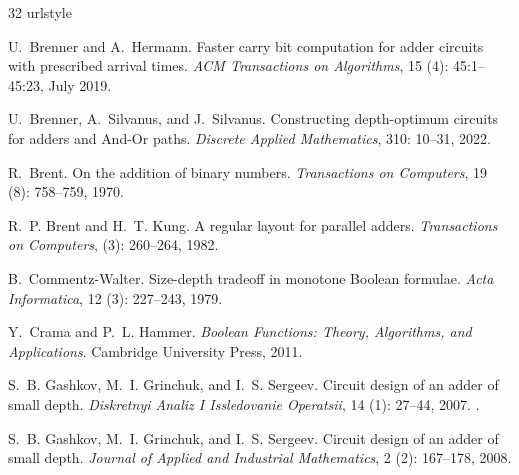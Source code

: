 \begin{thebibliography}{32}
\providecommand{\natexlab}[1]{#1}
\providecommand{\url}[1]{\texttt{#1}}
\expandafter\ifx\csname urlstyle\endcsname\relax
  \providecommand{\doi}[1]{doi: #1}\else
  \providecommand{\doi}{doi: \begingroup \urlstyle{rm}\Url}\fi

U.~Brenner and A.~Hermann.
\newblock Faster carry bit computation for adder circuits with prescribed
  arrival times.
\newblock \emph{ACM Transactions on Algorithms}, 15 (4):
  45:1--45:23, July 2019.

U.~Brenner, A.~Silvanus, and J.~Silvanus.
\newblock Constructing depth-optimum circuits for adders and {And-Or} paths.
\newblock \emph{Discrete Applied Mathematics}, 310: 10--31, 2022.

R.~Brent.
\newblock On the addition of binary numbers.
\newblock \emph{Transactions on Computers}, 19 (8): 758--759,
  1970.

R.~P. Brent and H.~T. Kung.
\newblock A regular layout for parallel adders.
\newblock \emph{Transactions on Computers},  (3): 260--264,
  1982.

B.~Commentz-Walter.
\newblock Size-depth tradeoff in monotone {Boolean} formulae.
\newblock \emph{Acta Informatica}, 12 (3): 227--243, 1979.

Y.~Crama and P.~L. Hammer.
\newblock \emph{Boolean Functions: Theory, Algorithms, and Applications}.
\newblock Cambridge University Press, 2011.

S.~B. Gashkov, M.~I. Grinchuk, and I.~S. Sergeev.
\newblock Circuit design of an adder of small depth.
\newblock \emph{Diskretnyi Analiz I Issledovanie Operatsii}, 14
  (1): 27--44, 2007.
 \cite{gashkov07eng}.

S.~B. Gashkov, M.~I. Grinchuk, and I.~S. Sergeev.
\newblock Circuit design of an adder of small depth.
\newblock \emph{Journal of Applied and Industrial Mathematics}, 2
  (2): 167--178, 2008.


\end{thebibliography}
